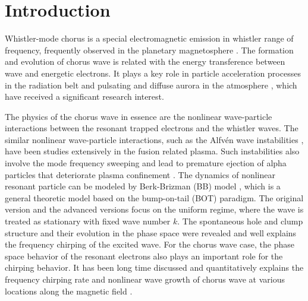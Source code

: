 \section{Introduction}
\label{sec:intro}
Whistler-mode chorus is a special electromagnetic emission in whistler range of frequency, frequently observed in the planetary magnetosphere \cite{burtis_magnetospheric_1976,tsurutani_postmidnight_1974}.
The formation and evolution of chorus wave is related with the energy transference between wave and energetic electrons.
It plays a key role in particle acceleration processes in the radiation belt \cite{horne_wave_2005,thorne_rapid_2013,reeves_electron_2013} and pulsating and diffuse aurora in the atmosphere \cite{nishimura_identifying_2010,kasahara_pulsating_2018,thorne_scattering_2010}, which have received a significant research interest.  

The physics of the chorus wave in essence are the nonlinear wave-particle interactions between the resonant trapped electrons and the whistler waves. 
The similar nonlinear wave-particle interactions, such as the Alfv\'en wave instabilities \cite{chen2016,wang2018}, have been studies extensively in the fusion related plasma.
Such instabilities also involve the mode frequency sweeping and lead to premature ejection of alpha particles that deteriorate plasma confinement \cite{fasoli2007}.
The dynamics of nonlinear resonant particle can be modeled by Berk-Brizman (BB) model \cite{berk_spontaneous_1997}, which is a general theoretic model based on the bump-on-tail (BOT) paradigm. 
The original version and the advanced versions \cite{lilley_formation_2014} focus on the uniform regime, where the wave is treated as stationary with fixed wave number $k$. 
The spontaneous hole and clump structure and their evolution in the phase space were revealed and well explains the frequency chirping of the excited wave.
For the chorus wave case, the phase space behavior of the resonant electrons also plays an important role for the  chirping behavior.
It has been long time discussed \cite{sudan_theory_1971} and quantitatively explains the frequency chirping rate and nonlinear wave growth of chorus wave at various locations along the magnetic field \cite{omura_theory_2008,omura_nonlinear_2021}.

